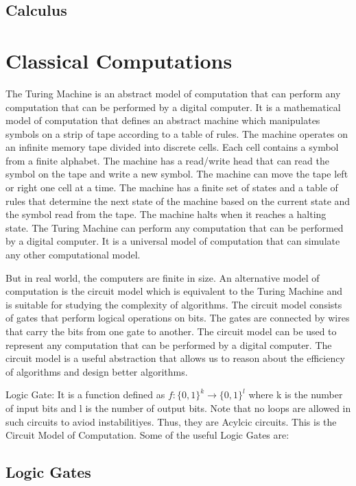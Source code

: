 \documentclass[12pt, oneside]{book}
\theoremstyle{definition}
\theoremstyle{definition}
\theoremstyle{remark}
\begin{document}
\section{Calculus}






\chapter{Classical Computations}
The Turing Machine is an abstract model of computation that can perform any computation that can be performed by a digital computer. It is a mathematical model of computation that defines an abstract machine which manipulates symbols on a strip of tape according to a table of rules.
The machine operates on an infinite memory tape divided into discrete cells. Each cell contains a symbol from a finite alphabet. The machine has a read/write head that can read the symbol on the tape and write a new symbol. The machine can move the tape left or right one cell at a time. The machine has a finite set of states and a table of rules that determine the next state of the machine based on the current state and the symbol read from the tape. The machine halts when it reaches a halting state. The Turing Machine can perform any computation that can be performed by a digital computer. It is a universal 
model of computation that can simulate any other computational model.

But in real world, the computers are finite in size.
An alternative model of computation is the circuit model which is equivalent to the Turing Machine
and is suitable for studying the complexity of algorithms. The circuit model consists of gates that perform logical operations on bits. The gates are connected by wires that carry the bits from one gate to another. 
The circuit model can be used to represent any computation that can be performed by a 
digital computer. The circuit model is a useful abstraction that 
allows us to reason about the efficiency of algorithms and design better algorithms. 

Logic Gate: It is a function defined as $f:\{0,1\}^k \rightarrow \{0,1\}^l$ where k is the number of input bits and 
l is the number of output bits. Note that no loops are allowed in such circuits to aviod instabilitiyes. Thus, they are Acylcic circuits.
This is the Circuit Model of Computation.
Some of the useful Logic Gates are:
\section{Logic Gates}
\end{document}
